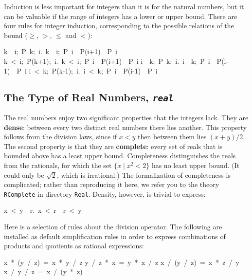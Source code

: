 Induction is less important for integers than it is for the natural numbers, but it can be valuable if the range of integers has a lower or upper bound.  There are four rules for integer induction, corresponding to the possible relations of the bound ($\geq$, $>$, $\leq$ and $<$):
\begin{isabelle}
\isasymlbrakk k\ \isasymle \ i;\ P\ k;\ \isasymAnd i.\ \isasymlbrakk k\ \isasymle \ i;\ P\ i\isasymrbrakk \ \isasymLongrightarrow \ P(i+1)\isasymrbrakk \ \isasymLongrightarrow \ P\ i%
\isanewline
\isasymlbrakk k\ <\ i;\ P(k+1);\ \isasymAnd i.\ \isasymlbrakk k\ <\ i;\ P\ i\isasymrbrakk \ \isasymLongrightarrow \ P(i+1)\isasymrbrakk \ \isasymLongrightarrow \ P\ i%
\isanewline
\isasymlbrakk i\ \isasymle \ k;\ P\ k;\ \isasymAnd i.\ \isasymlbrakk i\ \isasymle \ k;\ P\ i\isasymrbrakk \ \isasymLongrightarrow \ P(i-1)\isasymrbrakk \ \isasymLongrightarrow \ P\ i%
\isanewline
\isasymlbrakk i\ <\ k;\ P(k-1);\ \isasymAnd i.\ \isasymlbrakk i\ <\ k;\ P\ i\isasymrbrakk \ \isasymLongrightarrow \ P(i-1)\isasymrbrakk \ \isasymLongrightarrow \ P\ i%
\end{isabelle}


\subsection{The Type of Real Numbers, {\tt\slshape real}}

%
The real numbers enjoy two significant properties that the integers lack. 
They are
\textbf{dense}: between every two distinct real numbers there lies another.
This property follows from the division laws, since if $x<y$ then between
them lies $(x+y)/2$.  The second property is that they are
\textbf{complete}: every set of reals that is bounded above has a least
upper bound.  Completeness distinguishes the reals from the rationals, for
which the set $\{x\mid x^2<2\}$ has no least upper bound.  (It could only be
$\surd2$, which is irrational.)
The formalization of completeness is complicated; rather than
reproducing it here, we refer you to the theory \texttt{RComplete} in
directory \texttt{Real}.
Density, however, is trivial to express:
\begin{isabelle}
x\ <\ y\ \isasymLongrightarrow \ \isasymexists r.\ x\ <\ r\ \isasymand \ r\ <\ y%
\end{isabelle}

Here is a selection of rules about the division operator.  The following
are installed as default simplification rules in order to express
combinations of products and quotients as rational expressions:
\begin{isabelle}
x\ *\ (y\ /\ z)\ =\ x\ *\ y\ /\ z
\isanewline
y\ /\ z\ *\ x\ =\ y\ *\ x\ /\ z
\isanewline
x\ /\ (y\ /\ z)\ =\ x\ *\ z\ /\ y
\isanewline
x\ /\ y\ /\ z\ =\ x\ /\ (y\ *\ z)
\end{isabelle}

